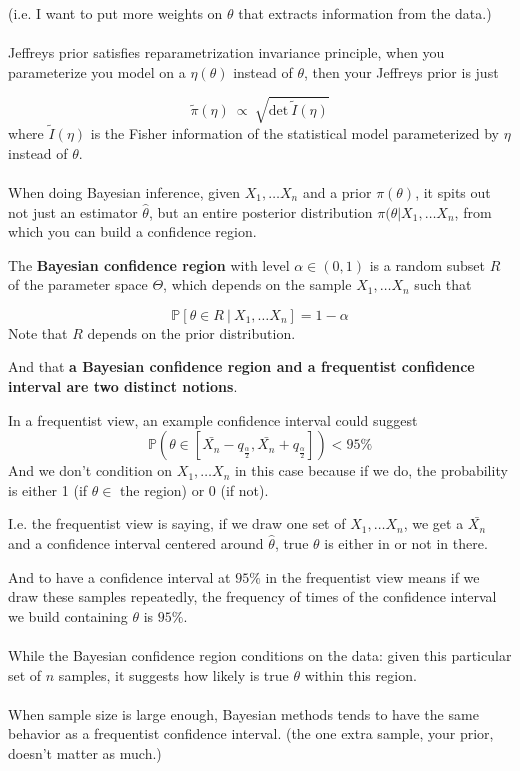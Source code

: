 \documentclass{article}
\begin{document}
(i.e. I want to put more weights on $\theta$ that extracts information from the data.)
\\
\\
Jeffreys prior satisfies reparametrization invariance principle, when you parameterize you model on a $\eta(\theta)$ instead of $\theta$,
then your Jeffreys prior is just 

$$
\tilde{\pi}(\eta) ~ \propto ~ \sqrt{\text{det} ~ \tilde{I}(\eta)}
$$
where $\tilde{I}(\eta)$ is the Fisher information of the statistical model parameterized by $\eta$ instead of $\theta$.
\\
\\

When doing Bayesian inference, given $X_1, \dots X_n$ and a prior $\pi(\theta)$, it spits out not just an estimator $\hat{\theta}$,
but an entire posterior distribution $\pi(\theta | X_1, \dots X_n$,
from which you can build a confidence region.

The \textbf{Bayesian confidence region} with level $\alpha \in (0, 1)$ is a random subset $\mathit{R}$ of the parameter space $\Theta$,
which depends on the sample $X_1, \dots X_n$ such that

$$
\mathbb{P}[\theta \in \mathit{R} ~ | ~ X_1, \dots X_n] = 1 - \alpha
$$
Note that $\mathit{R}$ depends on the prior distribution.

And that \textbf{a Bayesian confidence region and a frequentist confidence interval are two distinct notions}.

In a frequentist view,
an example confidence interval could suggest
$$
\mathbb{P}(\theta \in [\bar{X_n} - q_{\frac{\alpha}{2}}, \bar{X_n} + q_{\frac{\alpha}{2}}]) < 95\%
$$
And we don't condition on $X_1, \dots X_n$ in this case because if we do, the probability is either 1 (if $\theta \in $ the region) or 0 (if not).

I.e. the frequentist view is saying,
if we draw one set of $X_1, \dots X_n$, we get a $\bar{X_n}$ and a confidence interval centered around $\hat{\theta}$,
true $\theta$ is either in or not in there.

And to have a confidence interval at $95\%$ in the frequentist view means if we draw these samples repeatedly,
the frequency of times of the confidence interval we build containing $\theta$ is $95\%$.
\\
\\
While the Bayesian confidence region conditions on the data: given this particular set of $n$ samples,
it suggests how likely is true $\theta$ within this region.
\\
\\
When sample size is large enough,
Bayesian methods tends to have the same behavior as a frequentist confidence interval.
(the one extra sample, your prior, doesn't matter as much.)
\end{document}
